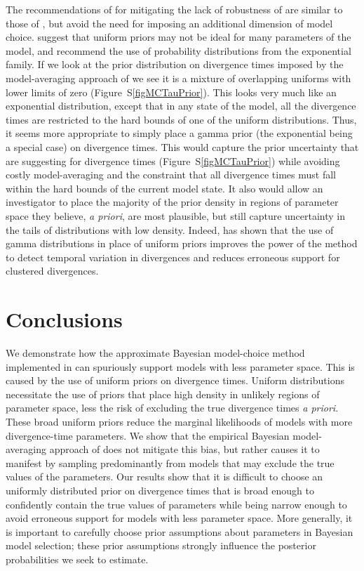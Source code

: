 The recommendations of \citet{Oaks2012} for mitigating the lack of robustness
of \msb are similar to those of \citet{Hickerson2013}, but avoid the
need for imposing an additional dimension of model choice.
\citet{Oaks2012} suggest that uniform priors may not be ideal for many
parameters of the \msb model, and recommend the use of probability
distributions from the exponential family.
If we look at the prior distribution on divergence times imposed by
the model-averaging approach of \citet{Hickerson2013} we see it is a mixture of
overlapping uniforms with lower limits of zero (Figure~S\ref{figMCTauPrior}).
This looks very much like an exponential distribution, except that in any state
of the model, all the divergence times are restricted to the hard
bounds of one of the uniform distributions.
Thus, it seems more appropriate to simply place a gamma prior (the exponential
being a special case) on divergence times.
This would capture the prior uncertainty that \citet{Hickerson2013} are
suggesting for divergence times (Figure~S\ref{figMCTauPrior}) while avoiding
costly model-averaging and the constraint that all divergence times must fall
within the hard bounds of the current model state.
It also would allow an investigator to place the majority of the prior density
in regions of parameter space they believe, \emph{a priori}, are most
plausible, but still capture uncertainty in the tails of distributions with low
density.
Indeed, \citet{Oaks2014dpp} has shown that the use of gamma distributions in
place of uniform priors improves the power of the method to detect temporal
variation in divergences and reduces erroneous support for clustered
divergences.


\section{Conclusions}
We demonstrate how the approximate Bayesian model-choice method implemented in
\msb can spuriously support models with less parameter space.
This is caused by the use of uniform priors on divergence times.
Uniform distributions necessitate the use of priors that place high density in
unlikely regions of parameter space, less the risk of excluding the true
divergence times \emph{a priori}.
These broad uniform priors reduce the marginal likelihoods of models with more
divergence-time parameters.
We show that the empirical Bayesian model-averaging approach of
\citet{Hickerson2013} does not mitigate this bias, but rather causes it to
manifest by sampling predominantly from models that may exclude the true values
of the parameters.
Our results show that it is difficult to choose an uniformly distributed
prior on divergence times that is broad enough to confidently contain the true
values of parameters while being narrow enough to avoid erroneous support for
models with less parameter space.
More generally, it is important to carefully choose prior assumptions about
parameters in Bayesian model selection; these prior assumptions strongly
influence the posterior probabilities we seek to estimate.

